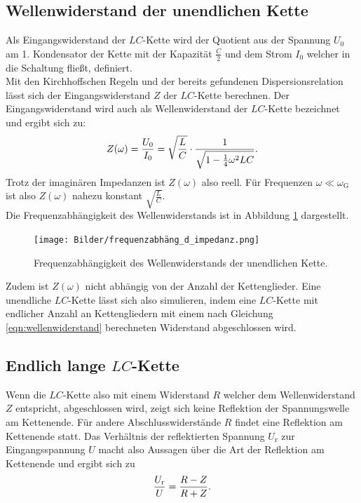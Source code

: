 \subsection{Wellenwiderstand der unendlichen Kette}
Als Eingangswiderstand der $LC$-Kette wird der Quotient aus der Spannung $U_{\mathrm{0}}$ am 1. Kondensator der Kette mit der Kapazität $\frac{C}{2}$ und dem Strom $I_{\mathrm{0}}$ welcher in die Schaltung fließt, definiert.\\
Mit den Kirchhoffschen Regeln und der bereits gefundenen Dispersionsrelation lässt sich der Eingangswiderstand $Z$ der $LC$-Kette berechnen.
Der Eingangswiderstand wird auch als Wellenwiderstand der $LC$-Kette bezeichnet und ergibt sich zu:
\begin{equation}
	\centering
	\label{eqn:wellenwiderstand}
	Z(\omega)=\frac{U_{\mathrm{0}}}{I_{\mathrm{0}}}=\sqrt{\frac{L}{C}}\cdot \frac{1}{\sqrt{1-\frac{1}{4}\omega^2LC}}.
\end{equation}
Trotz der imaginären Impedanzen ist $Z(\omega)$ also reell.
Für Frequenzen $\omega \ll \omega_{\mathrm{G}}$ ist also $Z(\omega)$ nahezu konstant $\sqrt{\frac{L}{C}}$.\\
Die Frequenzabhängigkeit des Wellenwiderstands ist in Abbildung \ref{fig:impedanz} dargestellt.
\begin{figure}
	\centering
	\texttt{[image: Bilder/frequenzabhäng\_d\_impedanz.png]}
	\caption{Frequenzabhängigkeit des Wellenwiderstands der unendlichen Kette. \cite{Anleitung}}
	\label{fig:impedanz}
\end{figure}
Zudem ist $Z(\omega)$ nicht abhängig von der Anzahl der Kettenglieder. Eine unendliche $LC$-Kette lässt sich also simulieren, indem eine $LC$-Kette mit endlicher Anzahl an Kettengliedern mit einem nach Gleichung \eqref{eqn:wellenwiderstand} berechneten Widerstand abgeschlossen wird.
\FloatBarrier

\subsection{Endlich lange $LC$-Kette}
Wenn die $LC$-Kette also mit einem Widerstand $R$ welcher dem Wellenwiderstand $Z$ entspricht, abgeschlossen wird, zeigt sich keine
Reflektion der Spannungswelle am Kettenende.
Für andere Abschlusswiderstände $R$ findet eine Reflektion am Kettenende statt.
Das Verhältnis der reflektierten Spannung $U_{\mathrm{r}}$ zur Eingangsspannung $U$ macht also Aussagen über die Art der Reflektion am Kettenende und ergibt sich zu
\begin{equation}
	\centering
	\label{eqn:abschluss}
	\frac{U_{\mathrm{r}}}{U}=\frac{R-Z}{R+Z}.
\end{equation}

